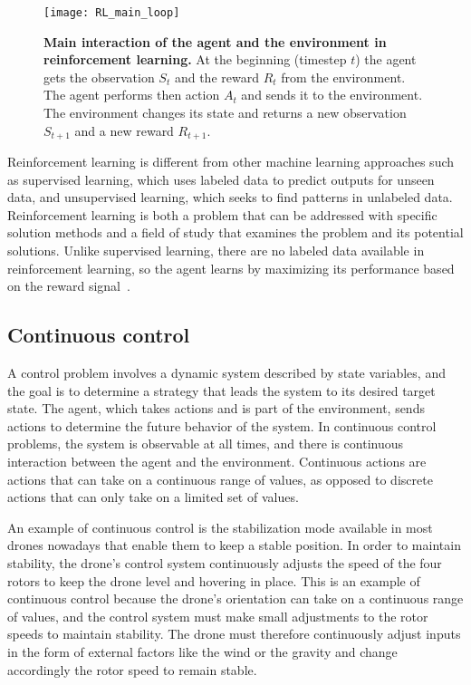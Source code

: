 \begin{figure}[!ht]
\centering
\texttt{[image: RL\_main\_loop]}
\caption[Main interaction of the agent and the environment in reinforcement learning]{
  \textbf{Main interaction of the agent and the environment in reinforcement learning.}
  At the beginning (timestep $t$) the agent gets the observation $S_t$ and the reward $R_t$ from the environment. The agent performs then action $A_t$ and sends it to the environment. The environment changes its state and returns a new observation $S_{t+1}$ and a new reward $R_{t+1}$.
 }
\label{fig:RL_main_loop}
\end{figure}

Reinforcement learning is different from other machine learning approaches such as supervised learning, which uses labeled data to predict outputs for unseen data, and unsupervised learning, which seeks to find patterns in unlabeled data. Reinforcement learning is both a problem that can be addressed with specific solution methods and a field of study that examines the problem and its potential solutions. Unlike supervised learning, there are no labeled data available in reinforcement learning, so the agent learns by maximizing its performance based on the reward signal~\cite{sutton_reinforcement_1998,sutton_reinforcement_2018}.

\subsection{Continuous control}
A control problem involves a dynamic system described by state variables, and the goal is to determine a strategy that leads the system to its desired target state. The agent, which takes actions and is part of the environment, sends actions to determine the future behavior of the system. In continuous control problems, the system is observable at all times, and there is continuous interaction between the agent and the environment. Continuous actions are actions that can take on a continuous range of values, as opposed to discrete actions that can only take on a limited set of values.

An example of continuous control is the stabilization mode available in most drones nowadays that enable them to keep a stable position. In order to maintain stability, the drone's control system continuously adjusts the speed of the four rotors to keep the drone level and hovering in place. This is an example of continuous control because the drone's orientation can take on a continuous range of values, and the control system must make small adjustments to the rotor speeds to maintain stability. The drone must therefore continuously adjust inputs in the form of external factors like the wind or the gravity and change accordingly the rotor speed to remain stable.

